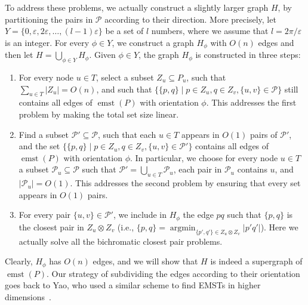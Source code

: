 \documentclass[11pt]{paper}
\newcommand {\eps} {\varepsilon}
\DeclareMathOperator {\emst}{emst}
\DeclareMathOperator {\argmin}{argmin}
\begin{document}
To address these problems, we actually construct a slightly larger graph
$H$, by partitioning the pairs in $\mathcal{P}$ according to their
direction. More precisely,
let $Y = \{0, \eps, 2\eps, \ldots, (l-1)\eps\}$ be a set of
$l$ numbers, where we assume 
that $l = 2\pi/\eps$ is an integer.
For every  $\phi \in Y$, we  construct a graph $H_\phi$
with $O(n)$ edges and then let $H = \bigcup_{\phi \in Y} H_\phi$.
Given $\phi \in Y$, the graph $H_\phi$ is constructed in three steps:
\begin{enumerate}
\item 
  For every node
  $u \in T$, select a subset $Z_u \subseteq P_u$, such that
  $\sum_{u \in T} |Z_u| = O(n)$,
  and such that 
  $\{\{p, q\} \mid p \in Z_u, q \in Z_v, \{u, v\} \in \mathcal P\}$ still
  contains all edges of $\emst(P)$ with orientation $\phi$. This addresses
  the first problem by making the total set size linear.
\item 
  Find a subset $\mathcal{P}' \subseteq \mathcal{P}$,
  such that
  each $u \in T$ appears in $O(1)$ pairs of
  $\mathcal{P}'$, and the set 
  $\{\{p, q\} \mid p \in Z_u, q \in Z_v, \{u, v\} \in \mathcal {P}'\}$
  contains all edges of $\emst(P)$ with orientation $\phi$.
In particular, we choose
  for every node $u \in T$ a subset
  $\mathcal{P}_u \subseteq \mathcal {P}$ such that
  $\mathcal{P}' = \bigcup_{u  \in T} \mathcal{P}_u$,
  each  pair in $\mathcal{P}_u$ contains $u$, and
  $|\mathcal{P}_u| = O(1)$. This addresses the second problem
  by ensuring that every set appears in $O(1)$ pairs.
\item 
  For every pair $\{u, v\} \in \mathcal{P}'$, we
  include in $H_\phi$ the edge $pq$ such that
  $\{p,q\}$ is the closest pair in $Z_u \otimes Z_v$ (i.e.,
  $\{p,q\} = \argmin_{\{p',q'\} \in Z_u \otimes Z_v} |p'q'|$).
  Here we actually solve all the bichromatic closest pair problems.
\end{enumerate}
Clearly, $H_\phi$ has $O(n)$ edges, and we will show that $H$ is indeed a
supergraph of $\emst(P)$. Our strategy of subdividing the edges
according to their orientation goes back to Yao, who
used a similar scheme to find EMSTs in higher dimensions~\cite{Yao82}. 
\end{document}
